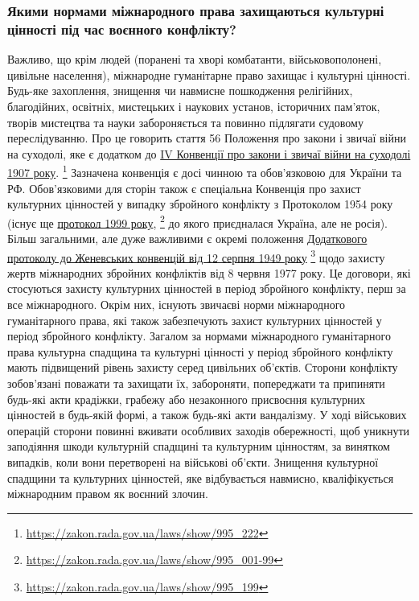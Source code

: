 \subsubsection{Якими нормами міжнародного права захищаються культурні цінності під час воєнного конфлікту?}

Важливо, що крім людей (поранені та хворі комбатанти, військовополонені,
цивільне населення), міжнародне гуманітарне право захищає і культурні цінності.
Будь-яке захоплення, знищення чи навмисне пошкодження релігійних, благодійних,
освітніх, мистецьких і наукових установ, історичних пам'яток, творів мистецтва
та науки забороняється та повинно підлягати судовому переслідуванню. Про це
говорить стаття 56 Положення про закони і звичаї війни на суходолі, яке є
додатком до \href{https://zakon.rada.gov.ua/laws/show/995_222}{IV Конвенції про закони і звичаї війни на суходолі 1907 року}.%
\footnote{\url{https://zakon.rada.gov.ua/laws/show/995_222}}
Зазначена конвенція є досі чинною та обов'язковою для України та РФ.
Обов'язковими для сторін також є спеціальна Конвенція про захист культурних
цінностей у випадку збройного конфлікту з Протоколом 1954 року (існує ще
\href{https://zakon.rada.gov.ua/laws/show/995_001-99}{протокол 1999 року},%
\footnote{\url{https://zakon.rada.gov.ua/laws/show/995_001-99}}
до якого приєдналася Україна, але не росія). Більш
загальними, але дуже важливими є окремі положення \href{https://zakon.rada.gov.ua/laws/show/995_199}{Додаткового протоколу до
Женевських конвенцій від 12 серпня 1949 року}%
\footnote{\url{https://zakon.rada.gov.ua/laws/show/995_199}}
щодо захисту жертв міжнародних
збройних конфліктів від 8 червня 1977 року. Це договори, які стосуються захисту
культурних цінностей в період збройного конфлікту, перш за все міжнародного.
Окрім них, існують звичаєві норми міжнародного гуманітарного права, які також
забезпечують захист культурних цінностей у період збройного конфлікту. Загалом
за нормами міжнародного гуманітарного права культурна спадщина та культурні
цінності у період збройного конфлікту мають підвищений рівень захисту серед
цивільних об'єктів. Сторони конфлікту зобов'язані поважати та захищати їх,
забороняти, попереджати та припиняти будь-які акти крадіжки, грабежу або
незаконного присвоєння культурних цінностей в будь-якій формі, а також будь-які
акти вандалізму. У ході військових операцій сторони повинні вживати особливих
заходів обережності, щоб уникнути заподіяння шкоди культурній спадщині та
культурним цінностям, за винятком випадків, коли вони перетворені на військові
об'єкти. Знищення культурної спадщини та культурних цінностей, яке відбувається
навмисно, кваліфікується міжнародним правом як воєнний злочин.

